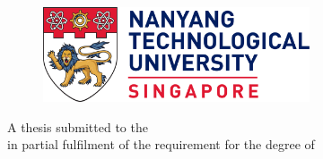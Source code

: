 \begin{titlepage}
  \begin{center}
    \begin{singlespace}

      {\LARGE\textbf{\thesistitle}}
      \null %

      \vfill

      \begin{figure}[H]
        \centering
        \includegraphics[width=0.7\textwidth]{images/Nanyang_Technological_University.png}
      \end{figure}

      \null %

      \vfill

      {\Large\textbf{\authorname}}

      \large{\deptname}

      \vfill

      A thesis submitted to the \schoolname \\
      in partial fulfilment of the requirement for the degree of \\
      \degreename

      \textbf{\submissionyear}

    \end{singlespace}
  \end{center}
\end{titlepage}
